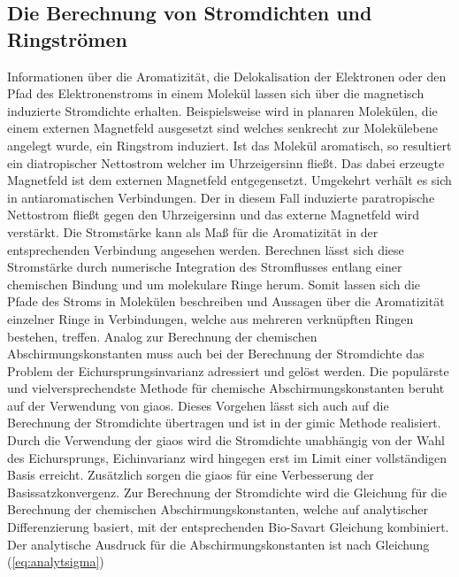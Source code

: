 \subsection{Die Berechnung von Stromdichten und Ringströmen}
Informationen über die Aromatizität, die Delokalisation der Elektronen oder den Pfad des Elektronenstroms in einem Molekül lassen sich über die magnetisch induzierte Stromdichte erhalten.\supercite{fliegl2011gauge} Beispielsweise wird in planaren Molekülen, die einem externen Magnetfeld ausgesetzt sind welches senkrecht zur Molekülebene angelegt wurde, ein Ringstrom induziert. Ist das Molekül aromatisch, so resultiert ein diatropischer Nettostrom welcher im Uhrzeigersinn fließt. Das dabei erzeugte Magnetfeld ist dem externen Magnetfeld entgegensetzt. Umgekehrt verhält es sich in antiaromatischen Verbindungen. Der in diesem Fall induzierte paratropische Nettostrom fließt gegen den Uhrzeigersinn und das externe Magnetfeld wird verstärkt. Die Stromstärke kann als Maß für die Aromatizität in der entsprechenden Verbindung angesehen werden. Berechnen lässt sich diese Stromstärke durch numerische Integration des Stromflusses entlang einer chemischen Bindung und um molekulare Ringe herum. Somit lassen sich die Pfade des Stroms in Molekülen beschreiben und Aussagen über die Aromatizität einzelner Ringe in Verbindungen, welche aus mehreren verknüpften Ringen bestehen, treffen. Analog zur Berechnung der chemischen Abschirmungskonstanten muss auch bei der Berechnung der Stromdichte das Problem der Eichursprungsinvarianz adressiert und gelöst werden. Die populärste und vielversprechendste Methode für chemische Abschirmungskonstanten beruht auf der Verwendung von \acp{giao}. Dieses Vorgehen lässt sich auch auf die Berechnung der Stromdichte übertragen und ist in der \ac{gimic}\supercite{juselius2004calculation,taubert2011calculation,fliegl2011gauge,sundholm2016calculations} Methode realisiert. Durch die Verwendung der \acp{giao} wird die Stromdichte unabhängig von der Wahl des Eichursprungs, Eichinvarianz wird hingegen erst im Limit einer vollständigen Basis erreicht.\supercite{juselius2004calculation} Zusätzlich sorgen die \acp{giao} für eine Verbesserung der Basissatzkonvergenz.\supercite{fliegl2011gauge} Zur Berechnung der Stromdichte wird die Gleichung für die Berechnung der chemischen Abschirmungskonstanten, welche auf analytischer Differenzierung basiert, mit der entsprechenden Bio-Savart Gleichung kombiniert.\supercite{lazzeretti2000ring} Der analytische Ausdruck für die Abschirmungskonstanten ist nach Gleichung (\ref{eq:analytsigma}) 

